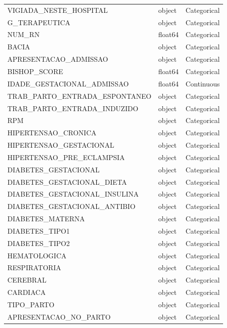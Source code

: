 \documentclass{article}
\begin{document}
\begin{longtable}{lll}
        VIGIADA\_NESTE\_HOSPITAL &   object &  Categorical \\
                 G\_TERAPEUTICA &   object &  Categorical \\
                        NUM\_RN &  float64 &  Categorical \\
                         BACIA &   object &  Categorical \\
         APRESENTACAO\_ADMISSAO &   object &  Categorical \\
                  BISHOP\_SCORE &  float64 &  Categorical \\
    IDADE\_GESTACIONAL\_ADMISSAO &  float64 &   Continuous \\
 TRAB\_PARTO\_ENTRADA\_ESPONTANEO &   object &  Categorical \\
   TRAB\_PARTO\_ENTRADA\_INDUZIDO &   object &  Categorical \\
                           RPM &   object &  Categorical \\
           HIPERTENSAO\_CRONICA &   object &  Categorical \\
       HIPERTENSAO\_GESTACIONAL &   object &  Categorical \\
     HIPERTENSAO\_PRE\_ECLAMPSIA &   object &  Categorical \\
          DIABETES\_GESTACIONAL &   object &  Categorical \\
    DIABETES\_GESTACIONAL\_DIETA &   object &  Categorical \\
 DIABETES\_GESTACIONAL\_INSULINA &   object &  Categorical \\
  DIABETES\_GESTACIONAL\_ANTIBIO &   object &  Categorical \\
              DIABETES\_MATERNA &   object &  Categorical \\
                DIABETES\_TIPO1 &   object &  Categorical \\
                DIABETES\_TIPO2 &   object &  Categorical \\
                  HEMATOLOGICA &   object &  Categorical \\
                  RESPIRATORIA &   object &  Categorical \\
                      CEREBRAL &   object &  Categorical \\
                      CARDIACA &   object &  Categorical \\
                    TIPO\_PARTO &   object &  Categorical \\
         APRESENTACAO\_NO\_PARTO &   object &  Categorical \\

\end{longtable}
\end{document}
